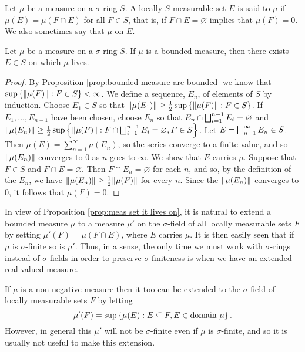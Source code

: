 \begin{definition}
Let $\mu$ be a measure on a $\sigma$-ring $S$. A locally $S$-measurable set $E$ is said to  $\mu$ if $\mu(E)=\mu(F\cap E)$ for all $F\in S$, that is, if $F\cap E=\varnothing$ implies that $\mu(F)=0$. We also sometimes say that $\mu$  on $E$.
\end{definition}

\begin{proposition}\label{prop:meas set it lives on}
Let $\mu$ be a measure on a $\sigma$-ring $S$. If $\mu$ is a bounded measure, then there exists $E\in S$ on which $\mu$ lives.
\end{proposition}

\begin{proof}
By Proposition \ref{prop:bounded measure are bounded} we know that $\sup\left\{\norm{\mu(F)}: F\in S\right\}<\infty$. We define a sequence, $E_n$, of elements of $S$ by induction. Choose $E_1\in S$ so that $\norm{\mu(E_1)}\geq\frac12\sup\left\{\norm{\mu(F)}: F\in S\right\}$. If $E_1,\dots,E_{n-1}$ have been chosen, choose $E_n$ so that $E_n\cap\bigsqcup_{i=1}^{n-1}E_i=\varnothing$ and $\norm{\mu(E_n)}\geq\frac12\sup\left\{\norm{\mu(F)}: F\cap\bigsqcup_{i=1}^{n-1}E_i=\varnothing,F\in S\right\}$. Let $E=\bigsqcup_{n=1}^{\infty} E_n\in S$. Then $\mu(E)=\sum_{n=1}^\infty\mu(E_n)$, so the series converge to a finite value, and so $\norm{\mu(E_n)}$ converges to $0$ as $n$ goes to $\infty$. We show that $E$ carries $\mu$. Suppose that $F\in S$ and $F\cap E=\varnothing$. Then $F\cap E_n=\varnothing$ for each $n$, and so, by the definition of the $E_n$, we have $\norm{\mu(E_n)}\geq\frac12\norm{\mu(F)}$ for every $n$. Since the $\norm{\mu(E_n)}$ converges to $0$, it follows that $\mu(F)=0$.
\end{proof}

In view of Proposition \ref{prop:meas set it lives on}, it is natural to extend a bounded measure $\mu$ to a measure $\mu'$ on the $\sigma$-field of all locally measurable sets $F$ by setting $\mu'(F)=\mu(F\cap E)$, where $E$ carries $\mu$. It is then easily seen that if $\mu$ is $\sigma$-finite so is $\mu'$. Thus, in a sense, the only time we must work with $\sigma$-rings instead of $\sigma$-fields in order to preserve $\sigma$-finiteness is when we have an extended real valued measure.

If $\mu$ is a non-negative measure then it too can be extended to the $\sigma$-field of locally measurable sets $F$ by letting \[\mu'(F)=\sup\left\{\mu(E):E\subseteq F,E\in\text{domain }\mu\right\}.\] However, in general this $\mu'$ will not be $\sigma$-finite even if $\mu$ is $\sigma$-finite, and so it is usually not useful to make this extension. 

